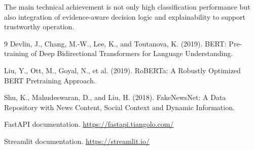 \documentclass[11pt,a4paper]{article}
\begin{document}
The main technical achievement is not only high classification performance but also integration of evidence-aware decision logic and explainability to support trustworthy operation.

\begin{thebibliography}{9}
Devlin, J., Chang, M.-W., Lee, K., and Toutanova, K. (2019). BERT: Pre-training of Deep Bidirectional Transformers for Language Understanding.

Liu, Y., Ott, M., Goyal, N., et al. (2019). RoBERTa: A Robustly Optimized BERT Pretraining Approach.

Shu, K., Mahudeswaran, D., and Liu, H. (2018). FakeNewsNet: A Data Repository with News Content, Social Context and Dynamic Information.

FastAPI documentation. \url{https://fastapi.tiangolo.com/}

Streamlit documentation. \url{https://streamlit.io/}
\end{thebibliography}
\end{document}
